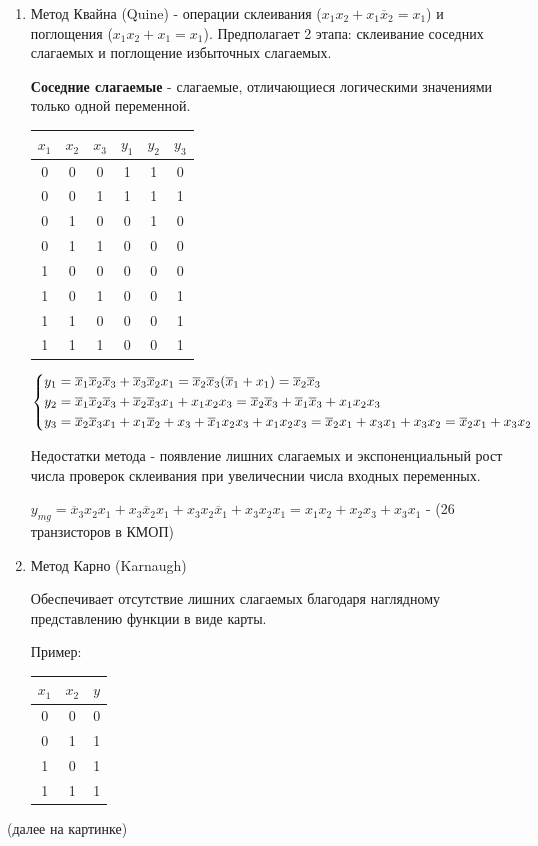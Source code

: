 \documentclass[a4paper,12pt]{report}
\begin{document}
\begin{enumerate}
\item Метод Квайна (Quine) - операции склеивания ($x_1x_2+x_1\overline{x}_2=x_1$) и поглощения ($x_1x_2+x_1=x_1$). Предполагает 2 этапа: склеивание соседних слагаемых и поглощение избыточных слагаемых.

\textbf{Соседние слагаемые} - слагаемые, отличающиеся логическими значениями только одной переменной.

\begin{tabular}{ c | c | c | c | c | c}
  $x_1$ & $x_2$ & $x_3$ & $y_1$ & $y_2$ & $y_3$ \\ \hline
  0 & 0 & 0 & 1 & 1 & 0\\
  0 & 0 & 1 & 1 & 1 & 1\\
  0 & 1 & 0 & 0 & 1 & 0\\
  0 & 1 & 1 & 0 & 0 & 0\\
  1 & 0 & 0 & 0 & 0 & 0\\
  1 & 0 & 1 & 0 & 0 & 1\\
  1 & 1 & 0 & 0 & 0 & 1\\
  1 & 1 & 1 & 0 & 0 & 1\\
\end{tabular}
\begin{equation}
\left\{
\begin{aligned}
& y_1=\overline{x}_1\overline{x}_2\overline{x}_3+\overline{x}_3\overline{x}_2x_1=\overline{x}_2\overline{x}_3(\overline{x}_1+x_1)=\overline{x}_2\overline{x}_3 \\
& y_2= \overline{x}_1\overline{x}_2\overline{x}_3+\overline{x}_2\overline{x}_3x_1+x_1x_2x_3=\overline{x}_2\overline{x}_3+\overline{x}_1\overline{x}_3+x_1x_2x_3 \\
& y_3= \overline{x}_2\overline{x}_3x_1+ x_1\overline{x}_2+x_3+\overline{x}_1x_2x_3+x_1x_2x_3=\overline{x}_2x_1+x_3x_1+x_3x_2 = \overline{x}_2x_1+x_3x_2  \notag
\end{aligned}
\right.
\end{equation}

Недостатки метода - появление лишних слагаемых и экспоненциальный рост числа проверок склеивания при увеличеснии числа входных переменных.

$y_{mg}=\overline{x}_3x_2x_1+x_3\overline{x}_2x_1+x_3x_2\overline{x}_1+x_3x_2x_1=x_1x_2+x_2x_3+x_3x_1$ - (26 транзисторов в КМОП)

\item Метод Карно (Karnaugh)

Обеспечивает отсутствие лишних слагаемых благодаря наглядному представлению функции в виде карты.

Пример:
\begin{tabular}{ c | c | c }
  $x_1$ & $x_2$ & $y$ \\ \hline
  0 & 0 & 0 \\
  0 & 1 & 1 \\
  1 & 0 & 1 \\
  1 & 1 & 1 \\
\end{tabular}
\end{enumerate}
(далее на картинке)
\end{document}
